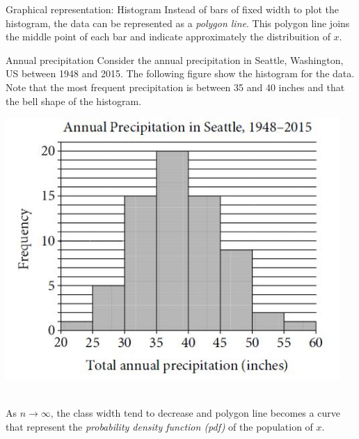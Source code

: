\documentclass[8pt]{beamer}
\begin{document}
\begin{frame}{Graphical representation: Histogram}
    Instead of bars of fixed width to plot the histogram, the data can be represented as a \emph{polygon line}. This polygon line joins the middle point of each bar and indicate approximately the distribuition of $x$. \\
    \begin{minipage}{0.495\textwidth}
    \begin{exampleblock}{Annual precipitation}
        Consider the annual precipitation in Seattle, Washington, US between 1948 and 2015. The following figure show the histogram for the data. Note that the most frequent precipitation is between 35 and 40 inches and that the bell shape of the histogram. 
    \end{exampleblock}
\end{minipage}
\hfill
\begin{minipage}{0.495\textwidth}
    \includegraphics[width=0.95\textwidth]{fie1.JPG}
\end{minipage}\\
As $n \to \infty$, the class width tend to decrease and polygon line becomes a curve that represent the \emph{probability density function (pdf)} of the population of $x$. 
\end{frame}
\end{document}

